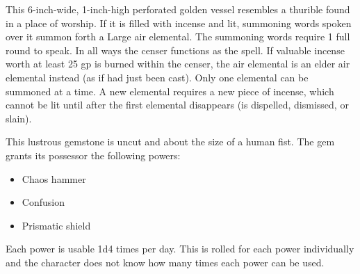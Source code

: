 {\begin{comment}
Size & Capacity & Speed & Weight & Market Price \\
5 ft. by 5 ft. & 200 lb. & 40 ft. & 8 lb. & 20,000 gp \\
5 ft. by 10 ft. & 400 lb. & 40 ft. & 15 lb. & 35,000 gp \\
10 ft. by 10 ft. & 800 lb. & 40 ft. & 10 lb. & 60,000 gp &

A carpet of flying can carry up to double its capacity, but doing so reduces its speed to 30 feet. It has average maneuverability, but a carpet of flying can still hover.

Moderate transmutation; CL 10th; Craft Wondrous Item, overland flight, permanency.
\end{comment}

 This 6-inch-wide, 1-inch-high perforated golden vessel resembles a thurible found in a place of worship. If it is filled with incense and lit, summoning words spoken over it summon forth a Large air elemental. The summoning words require 1 full round to speak. In all ways the censer functions as the  spell. If valuable incense worth at least 25 gp is burned within the censer, the air elemental is an elder air elemental instead (as if  had just been cast). Only one elemental can be summoned at a time. A new elemental requires a new piece of incense, which cannot be lit until after the first elemental disappears (is dispelled, dismissed, or slain).


 This lustrous gemstone is uncut and about the size of a human fist. The gem grants its possessor the following powers:
\begin{itemize}
\item Chaos hammer
\item Confusion
\item Prismatic shield
\end{itemize}

Each power is usable 1d4 times per day. This is rolled for each power individually and the character does not know how many times each power can be used.

}
